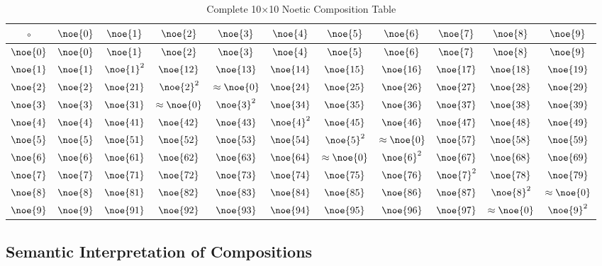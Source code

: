\begin{table}[h]
\centering
\caption{Complete 10×10 Noetic Composition Table}
\label{tab:composition}
\small
\begin{tabular}{c|cccccccccc}
$\circ$ & $\noe{0}$ & $\noe{1}$ & $\noe{2}$ & $\noe{3}$ & $\noe{4}$ & $\noe{5}$ & $\noe{6}$ & $\noe{7}$ & $\noe{8}$ & $\noe{9}$ \\
\hline
$\noe{0}$ & $\noe{0}$ & $\noe{1}$ & $\noe{2}$ & $\noe{3}$ & $\noe{4}$ & $\noe{5}$ & $\noe{6}$ & $\noe{7}$ & $\noe{8}$ & $\noe{9}$ \\
$\noe{1}$ & $\noe{1}$ & $\noe{1}^2$ & $\noe{12}$ & $\noe{13}$ & $\noe{14}$ & $\noe{15}$ & $\noe{16}$ & $\noe{17}$ & $\noe{18}$ & $\noe{19}$ \\
$\noe{2}$ & $\noe{2}$ & $\noe{21}$ & $\noe{2}^2$ & $\approx\noe{0}$ & $\noe{24}$ & $\noe{25}$ & $\noe{26}$ & $\noe{27}$ & $\noe{28}$ & $\noe{29}$ \\
$\noe{3}$ & $\noe{3}$ & $\noe{31}$ & $\approx\noe{0}$ & $\noe{3}^2$ & $\noe{34}$ & $\noe{35}$ & $\noe{36}$ & $\noe{37}$ & $\noe{38}$ & $\noe{39}$ \\
$\noe{4}$ & $\noe{4}$ & $\noe{41}$ & $\noe{42}$ & $\noe{43}$ & $\noe{4}^2$ & $\noe{45}$ & $\noe{46}$ & $\noe{47}$ & $\noe{48}$ & $\noe{49}$ \\
$\noe{5}$ & $\noe{5}$ & $\noe{51}$ & $\noe{52}$ & $\noe{53}$ & $\noe{54}$ & $\noe{5}^2$ & $\approx\noe{0}$ & $\noe{57}$ & $\noe{58}$ & $\noe{59}$ \\
$\noe{6}$ & $\noe{6}$ & $\noe{61}$ & $\noe{62}$ & $\noe{63}$ & $\noe{64}$ & $\approx\noe{0}$ & $\noe{6}^2$ & $\noe{67}$ & $\noe{68}$ & $\noe{69}$ \\
$\noe{7}$ & $\noe{7}$ & $\noe{71}$ & $\noe{72}$ & $\noe{73}$ & $\noe{74}$ & $\noe{75}$ & $\noe{76}$ & $\noe{7}^2$ & $\noe{78}$ & $\noe{79}$ \\
$\noe{8}$ & $\noe{8}$ & $\noe{81}$ & $\noe{82}$ & $\noe{83}$ & $\noe{84}$ & $\noe{85}$ & $\noe{86}$ & $\noe{87}$ & $\noe{8}^2$ & $\approx\noe{0}$ \\
$\noe{9}$ & $\noe{9}$ & $\noe{91}$ & $\noe{92}$ & $\noe{93}$ & $\noe{94}$ & $\noe{95}$ & $\noe{96}$ & $\noe{97}$ & $\approx\noe{0}$ & $\noe{9}^2$ \\
\end{tabular}
\end{table}

\subsection{Semantic Interpretation of Compositions}

